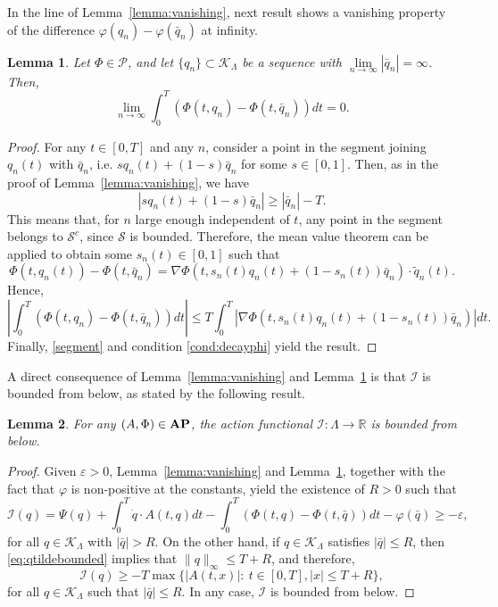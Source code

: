 \documentclass{article}
\newcommand{\boK}{\mathcal{K}}
\newcommand{\boI}{\mathcal{I}}
\newcommand{\R}{\mathbb{R}}
\newcommand{\boP}{\mathcal{P}}
\newcommand{\boS}{\mathcal{S}}
\newcommand{\dq}{\dot{q}}
\newcommand{\AP}{\textnormal{\textbf{AP}}}
\newtheorem{lemma}{Lemma}[section]
\theoremstyle{definition}
\begin{document}
In the line of Lemma~\ref{lemma:vanishing}, next result shows a vanishing property of the difference $\varphi(q_n)-\varphi(\bar q_n)$ at infinity.

\begin{lemma}\label{lemma:varphivanishing}
    Let $\Phi\in\boP$, and let $\{q_n\}\subset\boK_\Lambda$ be a sequence with $\lim\limits_{n\to\infty}|\bar q_n|=\infty$. Then, 
    \begin{equation}
         \lim_{n\to\infty}\int_0^T \left(\Phi(t,q_n)-\Phi(t,\bar q_n)\right)dt= 0.\label{statement:vanishingPhi}
    \end{equation}
\end{lemma}

\begin{proof}
    For any $t\in [0,T]$ and any $n$, consider a point in the segment joining $q_n(t)$ with $\bar q_n$, i.e. $sq_n(t)+(1-s)\bar q_n$ for some $s\in [0,1]$. Then, as in the proof of Lemma~\ref{lemma:vanishing}, we have
    \begin{equation}\label{segment}
    |s q_n(t)+(1-s)\bar q_n|\geq |\bar q_n|-T.
    \end{equation}
    This means that, for $n$ large enough independent of $t$, any point in the segment belongs to $\boS^c$, since $\boS$ is bounded. Therefore, the mean value theorem can be applied to obtain some $s_n(t)\in [0,1]$ such that
    \[\Phi(t,q_n(t))-\Phi(t,\bar q_n)=\nabla\Phi(t,s_n(t)q_n(t)+(1-s_n(t))\bar q_n)\cdot \tilde q_n(t).\]
    Hence,
    \[\left|\int_0^T \left(\Phi(t,q_n)-\Phi(t,\bar q_n)\right)dt\right|\leq T\int_0^T|\nabla\Phi(t,s_n(t)q_n(t)+(1-s_n(t))\bar q_n)|dt.\]
    Finally, \eqref{segment} and condition \eqref{cond:decayphi} yield the result.
\end{proof}

A direct consequence of Lemma~\ref{lemma:vanishing} and Lemma~\ref{lemma:varphivanishing} is that $\boI$ is bounded from below, as stated by the following result. 

\begin{lemma}\label{lemma:Ibounded}
    For any $(A,\Phi)\in\AP$, the action functional $\boI:\Lambda\to\R$ is bounded from below.
\end{lemma}

\begin{proof}
Given $\varepsilon>0$,  Lemma~\ref{lemma:vanishing} and Lemma~\ref{lemma:varphivanishing}, together with the fact that $\varphi$ is non-positive at the constants, yield the existence of $R>0$ such that
\begin{equation*}
\boI(q)=\Psi(q)+\int_0^T\dq\cdot A(t,q)dt - \int_0^T\left(\Phi(t,q)-\Phi(t,\bar q)\right)dt -\varphi(\bar q)\geq -\varepsilon,
\end{equation*}
for all $q\in\boK_\Lambda$ with $|\bar q|>R$. On the other hand, if $q\in\boK_\Lambda$ satisfies $|\bar q|\leq R$, then  \eqref{eq:qtildebounded} implies that $\|q\|_\infty\leq T+R$, and therefore,
\[\boI(q)\geq -T\max\{|A(t,x)|:\ t\in [0,T],|x|\leq T+R\},\]
for all $q\in\boK_\Lambda$ such that $|\bar q|\leq R$. In any case, $\boI$ is bounded from below.
\end{proof}
\end{document}

